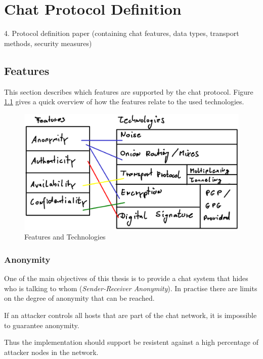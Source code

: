 \chapter{Chat Protocol Definition}
    4. Protocol definition paper (containing chat features,
            data types, transport methods, security measures)
\section{Features}
This section describes which features are supported by the chat protocol.
Figure \ref{features-technologies} gives a quick overview of how the
features relate to the used technologies.
\begin{figure}
    \centering
    \caption{Features and Technologies}
    \label{features-technologies}
    \includegraphics[scale=0.8]{features-technologies.eps}
\end{figure}
\subsection{Anonymity}
One of the main objectives of this thesis is to provide a chat system that
hides who is talking to whom (\textit{Sender-Receiver Anonymity}). 
In practise there are limits on the degree of anonymity that can be reached.


If an attacker controls all hosts that are 
part of the chat network, it is impossible to guarantee anonymity.

Thus the implementation should support be resistent against a high percentage
of attacker nodes in the network.

